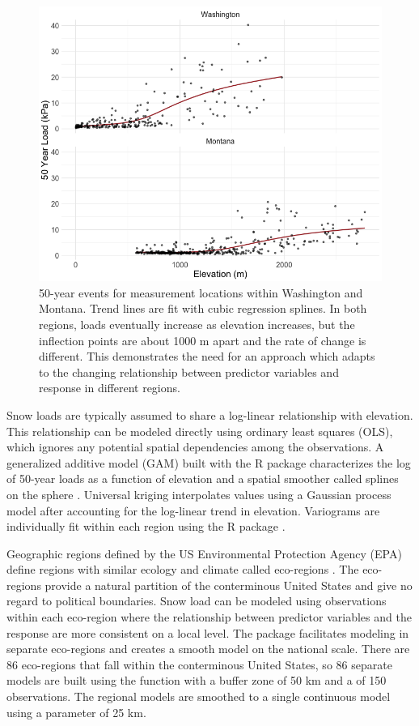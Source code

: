 \begin{figure}[htbp]
    \centering
    \includegraphics[width = .8\textwidth]{figures/elevation_plot.png}
    \caption{50-year events for measurement locations within Washington and Montana. Trend lines are fit with cubic regression splines. In both regions, loads eventually increase  as elevation increases, but the inflection points are about 1000 m apart and the rate of change is different. This demonstrates the need for an approach which adapts to the changing relationship between predictor variables and response in different regions.}
    \label{fig:elevation}
\end{figure}

Snow loads are typically assumed to share a log-linear relationship with elevation. This relationship can be modeled directly using ordinary least squares (OLS), which ignores any potential spatial dependencies among the observations. A generalized additive model (GAM) built with the  R package \citep{wood2011} characterizes the log of 50-year loads as a function of elevation and a spatial smoother called splines on the sphere \citep{Wood2003}. Universal kriging interpolates values using a Gaussian process model after accounting for the log-linear trend in elevation. Variograms are individually fit within each region using the  R package \citep{hiemstra2009}.

Geographic regions defined by the US Environmental Protection Agency (EPA) define regions with similar ecology and climate called eco-regions \citep{cec1997}. The eco-regions provide a natural partition of the conterminous United States and give no regard to political boundaries. Snow load can be modeled using observations within each eco-region where the relationship between predictor variables and the response are more consistent on a local level. The  package facilitates modeling in separate eco-regions and creates a smooth model on the national scale. There are 86 eco-regions that fall within the conterminous United States, so 86 separate models are built using the  function with a buffer zone of 50 km and a  of 150 observations. The regional models are smoothed to a single continuous model using a  parameter of 25 km.

